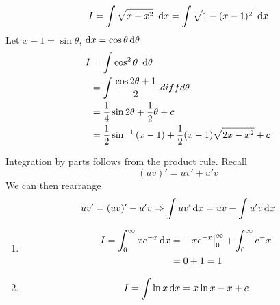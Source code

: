 \documentclass{article}
\begin{document}
\begin{eg}
    \[
        I = \int{\sqrt{x - x^2} \ \mathop{}\!\mathrm{d}x} = \int{\sqrt{1 - (x - 1)^2} \ \mathop{}\!\mathrm{d}x}    
    \]
    Let $x - 1 = \sin{\theta}$, $\mathop{}\!\mathrm{d} x = \cos{\theta} \mathop{}\!\mathrm{d} \theta$
    \begin{align*}
        I &= \int{\cos^2{\theta} \ \mathop{}\!\mathrm{d}\theta} \\
        &= \int{\frac{\cos{2\theta} + 1}{2}} \ diffd \theta \\
        &= \frac{1}{4}\sin{2\theta} + \frac{1}{2}\theta + c \\
        &= \frac{1}{2}\sin^{-1}{(x-1)} + \frac{1}{2}(x-1)\sqrt{2x - x^2} + c
    \end{align*}
\end{eg}

\begin{defi}[By parts]
    Integration by parts follows from the product rule. Recall
    \[
        (uv)' = uv' + u'v
    \]
    We can then rearrange
    \[
        uv' = (uv)' - u'v \Rightarrow \int{uv' \mathop{}\!\mathrm{d}x} = uv - \int{u'v \mathop{}\!\mathrm{d}x}
    \]
\end{defi}

\begin{eg}\leavevmode
    \begin{enumerate}
        \item \begin{align*}
            I = \int_{0}^{\infty}{xe^{-x} \mathop{}\!\mathrm{d} x} &= \left. -xe^{-x} \right\rvert_{0}^{\infty} + \int_{0}^{\infty}{e^-x} \\
            &= 0 + 1 = 1
        \end{align*}
        \item \[
            I = \int{\ln{x} \mathop{}\!\mathrm{d}x} = x\ln{x} - x + c    
        \]
    \end{enumerate}
\end{eg}

\end{document}
